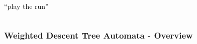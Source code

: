 \documentclass{beamer}
\begin{document}
\begin{frame}
\begin{overlayarea}{\textwidth}{0.8\textheight}
\begin{columns}
\begin{column}{0.65\textwidth}
\begin{onlyenv}
\begin{center}
              \enquote{play the run}
            \end{center}
          \end{onlyenv}
        \end{column}
      \end{columns}
    \end{overlayarea}
  \end{frame}

  \begin{frame}
    \frametitle{Weighted Descent Tree Automata - Overview}
  \end{frame}
\end{document}
